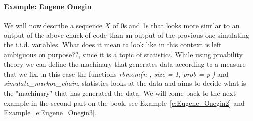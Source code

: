 	\paragraph{ Example: Eugene Onegin }
	We will now describe a sequence $\underline X$ of 0s and 1s that looks more similar to an output of the above chuck of code than an output of the provious one simulating the i.i.d. variables. What does it mean to look like in this context is left ambiguous on purpose??, since it is a topic of statistics. While using proability theory we can define the machinary that generates data according to a measure that we fix, in this case the functions \textit{rbinom(n , size = 1, prob = p )} and \textit{ simulate\_markov\_chain}, statistics looks at the data and aims to decide what is the "machinary" that has generated the data. We will come back to the next example in the second part on the book, see Example~\ref{e:Eugene_Onegin2} and Example~\ref{e:Eugene_Onegin3}.     
